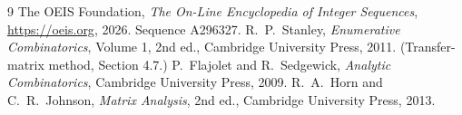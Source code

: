 \documentclass[11pt,a4paper]{article}
\theoremstyle{plain}
\theoremstyle{definition}
\begin{document}
\begin{thebibliography}{9}
 The OEIS Foundation, \emph{The On-Line Encyclopedia of Integer
Sequences}, \url{https://oeis.org}, 2026. Sequence A296327.
 R.~P.~Stanley, \emph{Enumerative Combinatorics}, Volume 1, 2nd ed.,
Cambridge University Press, 2011. (Transfer-matrix method, Section 4.7.)
 P.~Flajolet and R.~Sedgewick, \emph{Analytic Combinatorics}, Cambridge
University Press, 2009.
 R.~A.~Horn and C.~R.~Johnson, \emph{Matrix Analysis}, 2nd ed., Cambridge
University Press, 2013.
\end{thebibliography}
\end{document}
